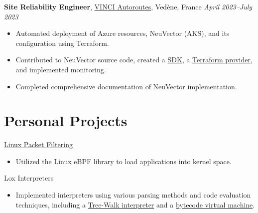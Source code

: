 \documentclass[margin,line]{../res}
\begin{document}
\begin{resume}
	{\bf Site Reliability Engineer}, \href{https://www.vinci-autoroutes.com}{VINCI Autoroutes}, Vedène, France
	\hfill {\it April 2023--July 2023}
	\vspace*{.05in}
	\begin{itemize}
		\item Automated deployment of Azure resources, NeuVector (AKS), and its configuration using Terraform.
		\item Contributed to NeuVector source code, created a \href{https://github.com/theobori/go-neuvector}{SDK}, a \href{https://github.com/theobori/terraform-provider-neuvector}{Terraform provider}, and implemented monitoring.
		\item Completed comprehensive documentation of NeuVector implementation.
	\end{itemize}


	\section{\sc Personal Projects}
	\href{https://github.com/theobori/tinyfilter}{Linux Packet Filtering}
	\begin{itemize}
		\item Utilized the Linux eBPF library to load applications into kernel space.
	\end{itemize}

	Lox Interpreters
	\begin{itemize}
		\item Implemented interpreters using various parsing methods and code evaluation techniques, including a \href{https://github.com/theobori/tinylox}{Tree-Walk interpreter} and a \href{https://github.com/theobori/lox-virtual-machine}{bytecode virtual machine}.
	\end{itemize}



\end{resume}
\end{document}
